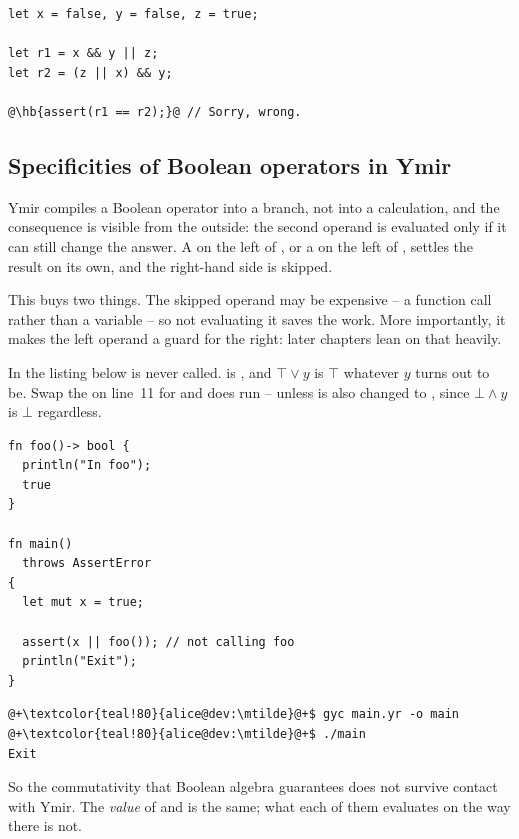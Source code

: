 \begin{lstlisting}[style=coloredverbatim, label=lst:types:boolean_error, caption=Example of logic error when dealing with Boolean values, escapechar=@]
let x = false, y = false, z = true;

let r1 = x && y || z;
let r2 = (z || x) && y;

@\hb{assert(r1 == r2);}@ // Sorry, wrong. 
\end{lstlisting}

\subsection{Specificities of Boolean operators in Ymir}

Ymir compiles a Boolean operator into a branch, not into a calculation, and the
consequence is visible from the outside: the second operand is evaluated only if
it can still change the answer. A  on the left of \token{&&}, or a
 on the left of \token{||}, settles the result on its own, and the
right-hand side is skipped.

This buys two things. The skipped operand may be expensive -- a function call
rather than a variable -- so not evaluating it saves the work. More importantly,
it makes the left operand a guard for the right: later chapters lean on that
heavily.

In the listing below  is never called.  is , and
$\top \lor y$ is $\top$ whatever $y$ turns out to be. Swap the \token{||} on
line~11 for \token{&&} and  does run -- unless  is also
changed to , since $\bot \land y$ is $\bot$ regardless.

\begin{lstlisting}[style=coloredverbatim, caption=Example of boolean operation optimised out]
fn foo()-> bool {
  println("In foo");
  true
}

fn main()
  throws AssertError
{
  let mut x = true;

  assert(x || foo()); // not calling foo
  println("Exit");
}
\end{lstlisting}
\begin{lstlisting}[style=bashVerb, escapechar=@+]
@+\textcolor{teal!80}{alice@dev:\mtilde}@+$ gyc main.yr -o main
@+\textcolor{teal!80}{alice@dev:\mtilde}@+$ ./main
Exit
\end{lstlisting}


So the commutativity that Boolean algebra guarantees does not survive contact
with Ymir. The \emph{value} of  and  is the same; what
each of them evaluates on the way there is not.
